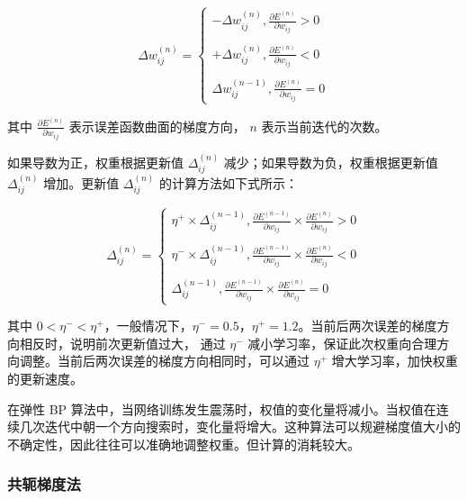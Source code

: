 \documentclass[UTF8]{ctexart}
\begin{document}
\begin{equation}
\Delta w_{ij}^{(n)}=\begin{cases}
-\Delta w_{ij}^{(n)},\frac{\partial E^{(n)}}{\partial w_{ij}} > 0 \\ \\ 
+\Delta w_{ij}^{(n)},\frac{\partial E^{(n)}}{\partial w_{ij}} < 0 \\ \\
\Delta w_{ij}^{(n-1)},\frac{\partial E^{(n)}}{\partial w_{ij}} = 0
\end{cases}
\end{equation}

其中 $\frac{\partial E^{(n)}}{\partial w_{ij}}$ 表示误差函数曲面的梯度方向， $n$ 表示当前迭代的次数。 \par

如果导数为正，权重根据更新值 $\Delta_{ij}^{(n)}$ 减少；如果导数为负，权重根据更新值 $\Delta_{ij}^{(n)}$ 增加。更新值 $\Delta_{ij}^{(n)}$ 的计算方法如下式所示：  \par

\begin{equation}
\Delta_{ij}^{(n)}=\begin{cases}
\eta^{+} \times \Delta_{ij}^{(n - 1)}, \frac{\partial E^{(n-1)}}{\partial w_{ij}} \times \frac{\partial E^{(n)}}{\partial w_{ij}} > 0 \\ \\
\eta^{-} \times \Delta_{ij}^{(n - 1)}, \frac{\partial E^{(n-1)}}{\partial w_{ij}} \times \frac{\partial E^{(n)}}{\partial w_{ij}} < 0 \\ \\
\Delta_{ij}^{(n - 1)}, \frac{\partial E^{(n-1)}}{\partial w_{ij}} \times \frac{\partial E^{(n)}}{\partial w_{ij}} = 0
\end{cases}
\end{equation}

其中 $0 < \eta^{-} < \eta^{+}$，一般情况下，$\eta^{-} = 0.5$，$\eta^{+} = 1.2$。当前后两次误差的梯度方向相反时，说明前次更新值过大， 通过 $\eta^{-}$ 减小学习率，保证此次权重向合理方向调整。当前后两次误差的梯度方向相同时，可以通过 $\eta^{+}$ 增大学习率，加快权重的更新速度。 \par

在弹性 BP 算法中，当网络训练发生震荡时，权值的变化量将减小。当权值在连续几次迭代中朝一个方向搜索时，变化量将增大。这种算法可以规避梯度值大小的不确定性，因此往往可以准确地调整权重。但计算的消耗较大。

\subsubsection{共轭梯度法}
\end{document}
